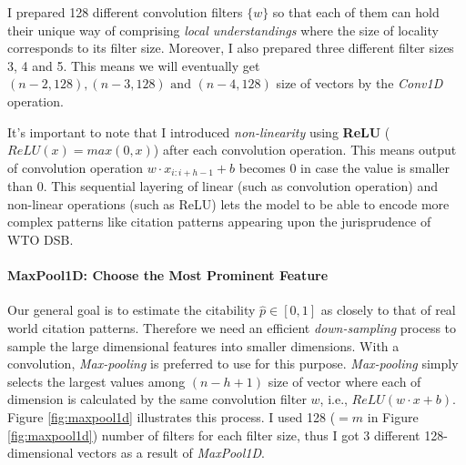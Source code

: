 \documentclass[12pt,letterpaper]{article}
\begin{document}
 
I prepared 128 different convolution filters $\{w\}$  so that each of them can hold their unique way of comprising \textit{local understandings} where the size of locality corresponds to its filter size.
Moreover, I also prepared three different filter sizes 3, 4 and 5. This means we will eventually get $(n-2, 128), (n-3, 128) \text{ and } (n-4,128)$ size of vectors by the \textit{Conv1D} operation.
 
It's important to note that I introduced \textit{non-linearity} using \textbf{ReLU} ($ReLU(x) = max(0, x)$) after each convolution operation.
This means output of convolution operation $w \cdot x_{i:i+h-1} + b$ becomes $0$ in case the value is smaller than $0$.
This sequential layering of linear (such as convolution operation) and non-linear operations (such as ReLU) lets the model to be able to encode
more complex patterns like citation patterns appearing upon the jurisprudence of WTO DSB.


\paragraph{MaxPool1D: Choose the Most Prominent Feature}

Our general goal is to estimate the citability $\hat{p} \in [0, 1]$ as closely to that of real world citation patterns.
Therefore we need an efficient \textit{down-sampling} process to sample the large dimensional features into smaller dimensions.
With a convolution, \textit{Max-pooling} is preferred to use for this purpose. \textit{Max-pooling} simply selects the largest values among $(n-h+1)$ size of vector where each of dimension is calculated by the same convolution filter $w$, i.e., $ReLU(w \cdot x + b)$.
Figure \ref{fig:maxpool1d} illustrates this process. I used 128 ($=m$ in Figure \ref{fig:maxpool1d}) number of filters for each filter size, thus I got 3 different 128-dimensional vectors as a result of \textit{MaxPool1D}.
\end{document}
